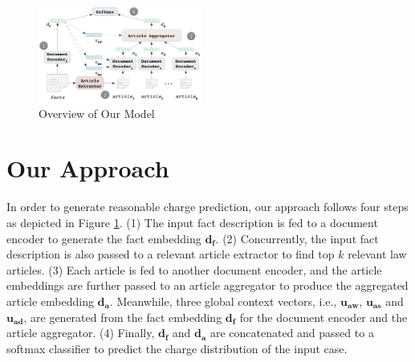 
\begin{figure}[t!]
\begin{center}
\includegraphics[width=0.48\textwidth]{figures/charge_pred_overview.png}	
\caption{Overview of Our Model}
\label{fig_model_framework}
\end{center}
\end{figure}

\section{Our Approach}
In order to generate reasonable charge prediction, our approach follows four steps as depicted in Figure \ref{fig_model_framework}. 
(1) The input fact description is fed to a document encoder to generate the fact embedding $\mathbf{d_f}$.
(2) Concurrently, the input fact description is also passed to a relevant article extractor to find top $k$ relevant law articles. 
(3) Each article is fed to another document encoder, and the article embeddings are further passed to an article aggregator to produce the aggregated article embedding $\mathbf{d_a}$. Meanwhile, three global context vectors, i.e., $\mathbf{u_{aw}}$, $\mathbf{u_{as}}$ and $\mathbf{u_{ad}}$, are generated from the fact embedding $\mathbf{d_f}$ for the document encoder and the article aggregator. 
(4) Finally, $\mathbf{d_f}$ and $\mathbf{d_a}$ are concatenated and passed to a softmax classifier to predict the charge distribution of the input case.


